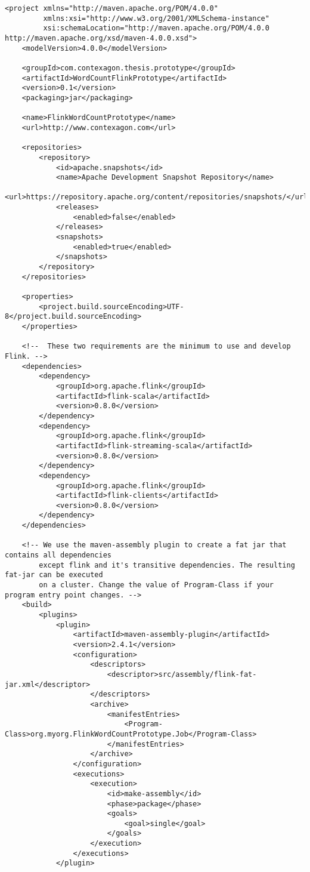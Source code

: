 \begin{lstlisting}[label=flinkpom,caption=Maven POM zum bauen von Flink-Applikationen als JAR und Fat-JAR inklusive aller Dependencies ]
<project xmlns="http://maven.apache.org/POM/4.0.0"
         xmlns:xsi="http://www.w3.org/2001/XMLSchema-instance"
         xsi:schemaLocation="http://maven.apache.org/POM/4.0.0 http://maven.apache.org/xsd/maven-4.0.0.xsd">
	<modelVersion>4.0.0</modelVersion>

	<groupId>com.contexagon.thesis.prototype</groupId>
	<artifactId>WordCountFlinkPrototype</artifactId>
	<version>0.1</version>
	<packaging>jar</packaging>

	<name>FlinkWordCountPrototype</name>
	<url>http://www.contexagon.com</url>

	<repositories>
		<repository>
			<id>apache.snapshots</id>
			<name>Apache Development Snapshot Repository</name>
			<url>https://repository.apache.org/content/repositories/snapshots/</url>
			<releases>
				<enabled>false</enabled>
			</releases>
			<snapshots>
				<enabled>true</enabled>
			</snapshots>
		</repository>
	</repositories>

	<properties>
		<project.build.sourceEncoding>UTF-8</project.build.sourceEncoding>
	</properties>

	<!--  These two requirements are the minimum to use and develop Flink. -->
	<dependencies>
		<dependency>
			<groupId>org.apache.flink</groupId>
			<artifactId>flink-scala</artifactId>
			<version>0.8.0</version>
		</dependency>
		<dependency>
			<groupId>org.apache.flink</groupId>
			<artifactId>flink-streaming-scala</artifactId>
			<version>0.8.0</version>
		</dependency>
		<dependency>
			<groupId>org.apache.flink</groupId>
			<artifactId>flink-clients</artifactId>
			<version>0.8.0</version>
		</dependency>
	</dependencies>

	<!-- We use the maven-assembly plugin to create a fat jar that contains all dependencies
		except flink and it's transitive dependencies. The resulting fat-jar can be executed
		on a cluster. Change the value of Program-Class if your program entry point changes. -->
	<build>
		<plugins>
			<plugin>
				<artifactId>maven-assembly-plugin</artifactId>
				<version>2.4.1</version>
				<configuration>
					<descriptors>
						<descriptor>src/assembly/flink-fat-jar.xml</descriptor>
					</descriptors>
					<archive>
						<manifestEntries>
							<Program-Class>org.myorg.FlinkWordCountPrototype.Job</Program-Class>
						</manifestEntries>
					</archive>
				</configuration>
				<executions>
					<execution>
						<id>make-assembly</id>
						<phase>package</phase>
						<goals>
							<goal>single</goal>
						</goals>
					</execution>
				</executions>
			</plugin>


\end{lstlisting}
